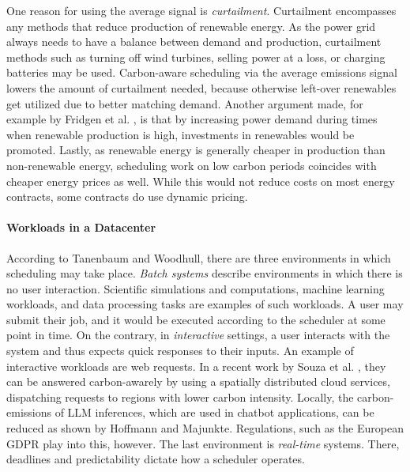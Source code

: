 One reason for using the average signal is \emph{curtailment}. 
Curtailment encompasses any methods that reduce production of renewable energy. As the power grid always needs to have a balance between demand and production, curtailment methods such as turning off wind turbines, selling power at a loss, or charging batteries may be used. 
Carbon-aware scheduling via the average emissions signal lowers the amount of curtailment needed, because otherwise left-over renewables get utilized due to better matching demand.
Another argument made, for example by Fridgen et al. \cite{fridgen_not_2021}, is that by increasing power demand during times when renewable production is high, investments in renewables would be promoted. 
Lastly, as renewable energy is generally cheaper in production than non-renewable energy, scheduling work on low carbon periods coincides with cheaper energy prices as well. While this would not reduce costs on most energy contracts, some contracts do use dynamic pricing.

\paragraph{Workloads in a Datacenter} According to Tanenbaum and Woodhull\cite{tanenbaum_operating_2006}, there are three environments in which scheduling may take place. \emph{Batch systems} describe environments in which there is no user interaction. 
Scientific simulations and computations, machine learning workloads, and data processing tasks are examples of such workloads\cite{sukprasert_limitations_2024}. 
A user may submit their job, and it would be executed according to the scheduler at some point in time. 
On the contrary, in \emph{interactive} settings, a user interacts with the system and thus expects quick responses to their inputs. 
An example of interactive workloads are web requests. In a recent work by Souza et al. \cite{souza_casper_2024}, they can be answered carbon-awarely by using a spatially distributed cloud services, dispatching requests to regions with lower carbon intensity. 
Locally, the carbon-emissions of LLM inferences, which are used in chatbot applications, can be reduced as shown by Hoffmann and Majunkte\cite{hoffmann_improving_2024}.
Regulations, such as the European GDPR  play into this, however.
The last environment is \emph{real-time} systems. There, deadlines and predictability dictate how a scheduler operates.

